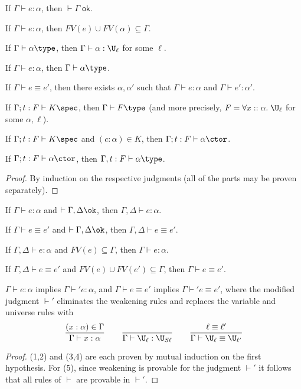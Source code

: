 \begin{lemma}[Regularity]\label{thm:reg}
\begin{thmlist}
\item If $\Gamma\vdash e:\alpha$, then $\vdash\Gamma\;\mathsf{ok}$.
\item If $\Gamma\vdash e:\alpha$, then $FV(e)\cup FV(\alpha)\subseteq\Gamma$.
\item If $\Gamma\vdash\alpha\type$, then $\Gamma\vdash\alpha:\U_\ell$ for some $\ell$.
\item If $\Gamma\vdash e:\alpha$, then $\Gamma\vdash\alpha\type$.
\item\label{item:defeq_reg2} If $\Gamma\vdash e\equiv e'$, then there exists $\alpha,\alpha'$ such that $\Gamma\vdash e:\alpha$ and $\Gamma\vdash e':\alpha'$.
\item If $\Gamma;t:F\vdash K\spec$, then $\Gamma\vdash F\type$ (and more precisely, $F=\forall x::\alpha.\;\U_\ell$ for some $\alpha,\ell$).
\item If $\Gamma;t:F\vdash K\spec$ and $(c:\alpha)\in K$, then $\Gamma;t:F\vdash\alpha\ctor$.
\item If $\Gamma;t:F\vdash \alpha\ctor$, then $\Gamma,t:F\vdash\alpha\type$.
\end{thmlist}
\end{lemma}
\begin{proof}
By induction on the respective judgments (all of the parts may be proven separately).
\end{proof}

\begin{lemma}[Weakening]\label{thm:weak}
\begin{thmlist}
\item If $\Gamma\vdash e:\alpha$ and $\vdash\Gamma,\Delta\ok$, then $\Gamma,\Delta\vdash e:\alpha$.
\item If $\Gamma\vdash e\equiv e'$ and $\vdash\Gamma,\Delta\ok$, then $\Gamma,\Delta\vdash e\equiv e'$.
\item If $\Gamma,\Delta\vdash e:\alpha$ and $FV(e)\subseteq\Gamma$, then $\Gamma\vdash e:\alpha$.
\item If $\Gamma,\Delta\vdash e\equiv e'$ and $FV(e)\cup FV(e')\subseteq\Gamma$, then $\Gamma\vdash e\equiv e'$.
\item $\Gamma\vdash e:\alpha$ implies $\Gamma\vdash' e:\alpha$, and $\Gamma\vdash e\equiv e'$ implies $\Gamma\vdash' e\equiv e'$, where the modified judgment $\vdash'$ eliminates the weakening rules and replaces the variable and universe rules with
$$\frac{(x:\alpha)\in\Gamma}{\Gamma\vdash x:\alpha}\qquad\frac{}{\Gamma\vdash \U_\ell:\U_{S\ell}}\qquad\frac{\ell\equiv\ell'}{\Gamma\vdash \U_\ell\equiv\U_{\ell'}}$$
\end{thmlist}
\end{lemma}
\begin{proof}
(1,2) and (3,4) are each proven by mutual induction on the first hypothesis. For (5), since weakening is provable for the judgment $\vdash'$ it follows that all rules of $\vdash$ are provable in $\vdash'$.
\end{proof}

